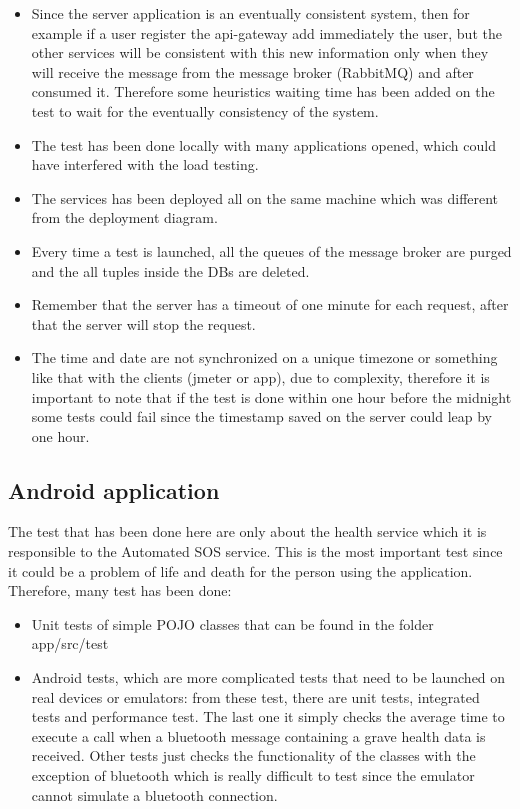 \begin{itemize}
\item Since the server application is an eventually consistent system, then for example if a user register the api-gateway add immediately the user, but the other services will be consistent with this new information only when they will receive the message from the message broker (RabbitMQ) and after consumed it. Therefore some heuristics waiting time has been added on the test to wait for the eventually consistency of the system.
\item The test has been done locally with many applications opened, which could have interfered with the load testing.
\item The services has been deployed all on the same machine which was different from the deployment diagram.
\item Every time a test is launched, all the queues of the message broker are purged and the all tuples inside the DBs are deleted.
\item Remember that the server has a timeout of one minute for each request, after that the server will stop the request.
\item The time and date are not synchronized on a unique timezone or something like that with the clients (jmeter or app), due to complexity, therefore it is important to note that if the test is done within one hour before the midnight some tests could fail since the timestamp saved on the server could leap by one hour.
\end{itemize}


\subsection{Android application}
The test that has been done here are only about the health service which it is responsible to the Automated SOS service. This is the most important test since it could be a problem of life and death for the person using the application. Therefore, many test has been done:
\begin{itemize}
\item Unit tests of simple POJO classes that can be found in the folder app/src/test
\item Android tests, which are more complicated tests that need to be launched on real devices or emulators: from these test, there are unit tests, integrated tests and performance test. The last one it simply checks the average time to execute a call when a bluetooth message containing a grave health data is received. Other tests just checks the functionality of the classes with the exception of 
bluetooth which is really difficult to test since the emulator cannot simulate a bluetooth connection.
\end{itemize}

